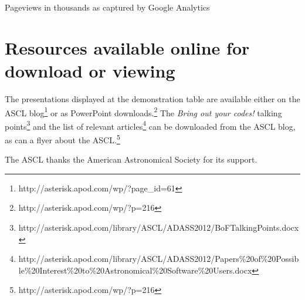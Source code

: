 {Pageviews in thousands as captured by Google Analytics}


\section{Resources available online for download or viewing}
The presentations displayed at the demonstration table are available either on the ASCL blog\footnote{http://asterisk.apod.com/wp/?page\_id=61} or as PowerPoint downloads.\footnote{http://asterisk.apod.com/wp/?p=216} The {\em Bring out your codes!} talking points\footnote{http://asterisk.apod.com/library/ASCL/ADASS2012/BoFTalkingPoints.docx} and the list of relevant articles\footnote{http://asterisk.apod.com/library/ASCL/ADASS2012/Papers\%20of\%20Possible\%20Interest\%20to\%20Astronomical\%20Software\%20Users.docx} can be downloaded from the ASCL blog, as can a flyer about the ASCL.\footnote{http://asterisk.apod.com/wp/?p=216}


\acknowledgements The ASCL thanks the American Astronomical Society for its support.
